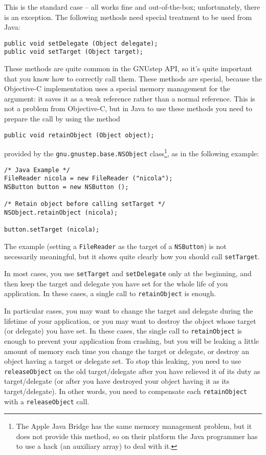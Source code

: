 This is the standard case -- all works fine and out-of-the-box;
unfortunately, there is an exception.  The following methods need
special treatment to be used from Java:
\begin{verbatim}
public void setDelegate (Object delegate);
public void setTarget (Object target);
\end{verbatim}
These methods are quite common in the GNUstep API, so it's quite
important that you know how to correctly call them.  These methods are
special, because the Objective-C implementation uses a special memory
management for the argument: it saves it as a weak reference rather
than a normal reference.  This is not a problem from Objective-C, but
in Java to use these methods you need to prepare the call by using the
method
\begin{verbatim}
public void retainObject (Object object);
\end{verbatim}
provided by the \texttt{gnu.gnustep.base.NSObject} class\footnote{The
Apple Java Bridge has the same memory management problem, but it does
not provide this method, so on their platform the Java programmer has
to use a hack (an auxiliary array) to deal with it.}, as in the
following example:
\begin{verbatim}
/* Java Example */
FileReader nicola = new FileReader ("nicola");
NSButton button = new NSButton ();

/* Retain object before calling setTarget */
NSObject.retainObject (nicola);

button.setTarget (nicola);
\end{verbatim}
The example (setting a \texttt{FileReader} as the target of a
\texttt{NSButton}) is not necessarily meaningful, but it shows quite 
clearly how you should call \texttt{setTarget}.

In most cases, you use \texttt{setTarget} and \texttt{setDelegate}
only at the beginning, and then keep the target and delegate you have 
set for the whole life of you application.  In these cases, a single 
call to \texttt{retainObject} is enough.

In particular cases, you may want to change the target and delegate
during the lifetime of your application, or you may want to destroy
the object whose target (or delegate) you have set.  In these cases,
the single call to \texttt{retainObject} is enough to prevent your
application from crashing, but you will be leaking a little amount of
memory each time you change the target or delegate, or destroy an
object having a target or delegate set.  To stop this leaking, you
need to use \texttt{releaseObject} on the old target/delegate after
you have relieved it of its duty as target/delegate (or after you have
destroyed your object having it as its target/delegate).  In other 
words, you need to compensate each \texttt{retainObject} with a 
\texttt{releaseObject} call.

